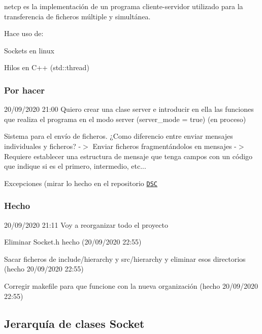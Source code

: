 {\ttfamily netcp} es la implementación de un programa cliente-\/servidor utilizado para la transferencia de ficheros múltiple y simultánea.

Hace uso de\+:
\begin{DoxyItemize}
\item Sockets en linux
\item Hilos en C++ ({\ttfamily std\+::thread})
\end{DoxyItemize}

\subsubsection*{Por hacer}


\begin{DoxyItemize}
\item 20/09/2020 21\+:00 Quiero crear una clase server e introducir en ella las funciones que realiza el programa en el modo server (server\+\_\+mode = true) (en proceso)
\item Sistema para el envío de ficheros. ¿\+Como diferencio entre enviar mensajes individuales y ficheros? -\/$>$ Enviar ficheros fragmentándolos en mensajes -\/$>$ Requiere establecer una estructura de mensaje que tenga campos con un código que indique si es el primero, intermedio, etc...
\item Excepciones (mirar lo hecho en el repositorio \href{https://github.com/miguel-martinr/Data-Structure-Classes}{\tt D\+SC}
\end{DoxyItemize}

\subsubsection*{Hecho}


\begin{DoxyItemize}
\item 20/09/2020 21\+:11 Voy a reorganizar todo el proyecto
\begin{DoxyItemize}
\item Eliminar Socket.\+h hecho (20/09/2020 22\+:55)
\item Sacar ficheros de include/hierarchy y src/hierarchy y eliminar esos directorios (hecho 20/09/2020 22\+:55)
\item Corregir makefile para que funcione con la nueva organización (hecho 20/09/2020 22\+:55)
\end{DoxyItemize}
\end{DoxyItemize}

\subsection*{Jerarquía de clases Socket}

